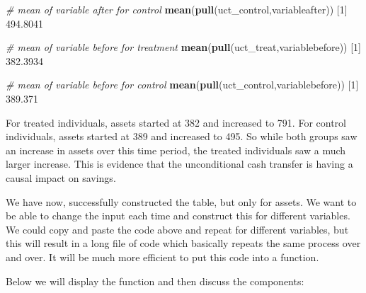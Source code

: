\documentclass[
]{book}
\newenvironment{Shaded}{\begin{snugshade}}{\end{snugshade}}
\newcommand{\CommentTok}[1]{\textcolor[rgb]{0.56,0.35,0.01}{\textit{#1}}}
\newcommand{\DecValTok}[1]{\textcolor[rgb]{0.00,0.00,0.81}{#1}}
\newcommand{\FloatTok}[1]{\textcolor[rgb]{0.00,0.00,0.81}{#1}}
\newcommand{\FunctionTok}[1]{\textcolor[rgb]{0.13,0.29,0.53}{\textbf{#1}}}
\newcommand{\NormalTok}[1]{#1}
\begin{document}
\begin{Shaded}
\begin{Highlighting}[]
\CommentTok{\# mean of variable after for control }
\FunctionTok{mean}\NormalTok{(}\FunctionTok{pull}\NormalTok{(uct\_control,variableafter))}
\NormalTok{[}\DecValTok{1}\NormalTok{] }\FloatTok{494.8041}

\CommentTok{\# mean of variable before for treatment }
\FunctionTok{mean}\NormalTok{(}\FunctionTok{pull}\NormalTok{(uct\_treat,variablebefore))}
\NormalTok{[}\DecValTok{1}\NormalTok{] }\FloatTok{382.3934}

\CommentTok{\# mean of variable before for control }
\FunctionTok{mean}\NormalTok{(}\FunctionTok{pull}\NormalTok{(uct\_control,variablebefore))}
\NormalTok{[}\DecValTok{1}\NormalTok{] }\FloatTok{389.371}
\end{Highlighting}
\end{Shaded}

For treated individuals, assets started at 382 and increased to 791. For control individuals, assets started at 389 and increased to 495. So while both groups saw an increase in assets over this time period, the treated individuals saw a much larger increase. This is evidence that the unconditional cash transfer is having a causal impact on savings.

We have now, successfully constructed the table, but only for assets. We want to be able to change the input each time and construct this for different variables. We could copy and paste the code above and repeat for different variables, but this will result in a long file of code which basically repeats the same process over and over. It will be much more efficient to put this code into a function.

Below we will display the function and then discuss the components:
\end{document}
